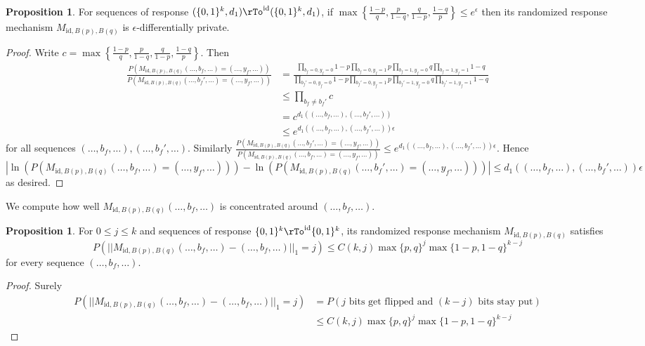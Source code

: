 \documentclass[12pt]{amsart}
\theoremstyle{definition}
\newtheorem{proposition}[theorem]{Proposition}
\begin{document}
\begin{proposition} \label{randomized_response_mechanism_privacy} For sequences of response $(\{0, 1\}^k, d_1) \rTo^{\text{id}} (\{0, 1\}^k, d_1)$, if $\max \left\{ \frac{1 - p}{q}, \frac{p}{1 - q}, \frac{q}{1 - p}, \frac{1 - q}{p} \right\} \leq e^{\epsilon}$ then its randomized response mechanism $M_{\text{id}, B(p), B(q)}$ is $\epsilon$-differentially private.
\end{proposition}
\begin{proof} Write $c = \max \left\{ \frac{1 - p}{q}, \frac{p}{1 - q}, \frac{q}{1 - p}, \frac{1 - q}{p} \right\}$. Then
\begin{align*}
\frac{P(M_{\text{id}, B(p), B(q)}(\dots , b_f, \dots) = (\dots , y_f, \dots))}{P(M_{\text{id}, B(p), B(q)}(\dots , b_f', \dots) = (\dots , y_f, \dots))} & = \frac{\prod\limits_{b_f = 0, y_f = 0} 1 - p \prod\limits_{b_f = 0, y_f = 1} p \prod\limits_{b_f = 1, y_f = 0} q \prod\limits_{b_f = 1, y_f = 1} 1 - q}{\prod\limits_{b_f' = 0, y_f = 0} 1 - p \prod\limits_{b_f' = 0, y_f = 1} p \prod\limits_{b_f' = 1, y_f = 0} q \prod\limits_{b_f' = 1, y_f = 1} 1 - q} \\
 & \leq \prod\limits_{b_f \neq b_f'} c \\
 & = c^{d_1((\dots , b_f, \dots), (\dots , b_f', \dots))} \\
 & \leq e^{d_1((\dots , b_f, \dots), (\dots , b_f', \dots)) \epsilon}
\end{align*}
for all sequences $(\dots , b_f, \dots), (\dots , b_f', \dots)$. Similarly $\frac{P(M_{\text{id}, B(p), B(q)}(\dots , b_f', \dots) = (\dots , y_f, \dots))}{P(M_{\text{id}, B(p), B(q)}(\dots , b_f, \dots) = (\dots , y_f, \dots))} \leq e^{d_1((\dots , b_f, \dots), (\dots , b_f', \dots)) \epsilon}$. Hence $|\ln(P(M_{\text{id}, B(p), B(q)}(\dots , b_f, \dots) = (\dots , y_f, \dots))) - \ln(P(M_{\text{id}, B(p), B(q)}(\dots , b_f', \dots) = (\dots , y_f, \dots)))| \leq d_1((\dots , b_f, \dots), (\dots , b_f', \dots)) \epsilon$ as desired.
\end{proof}

We compute how well $M_{\text{id}, B(p), B(q)}(\dots , b_f, \dots)$ is concentrated around $(\dots , b_f, \dots)$.

\begin{proposition} \label{randomized_response_mechanism_accuracy} For $0 \leq j \leq k$ and sequences of response $\{0, 1\}^k \rTo^{\text{id}} \{0, 1\}^k$, its randomized response mechanism $M_{\text{id}, B(p), B(q)}$ satisfies
$$P(||M_{\text{id}, B(p), B(q)}(\dots , b_f, \dots) - (\dots , b_f, \dots)||_1 = j) \leq C(k, j) \max\{p, q\}^j \max\{1 - p, 1 - q\}^{k - j}$$
for every sequence $(\dots , b_f, \dots)$.
\end{proposition}
\begin{proof} Surely
\begin{align*}
P(||M_{\text{id}, B(p), B(q)}(\dots , b_f, \dots) - (\dots , b_f, \dots)||_1 = j) & = P(j \text{ bits get flipped and } (k - j) \text{ bits stay put}) \\
 & \leq C(k, j) \max\{p, q\}^j \max\{1 - p, 1 - q\}^{k - j}
\end{align*}
\end{proof}
\end{document}
